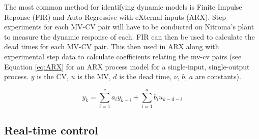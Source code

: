 The most common method for identifying dynamic models is Finite Impulse Reponse (FIR) and Auto Regressive with eXternal inputs (ARX). Step experiments for each MV-CV pair will have to be conducted on Nitroma's plant to measure the dynamic response of each. FIR can then be used to calculate the dead times for each MV-CV pair. This then used in ARX along with experimental step data to calculate coefficients relating the mv-cv pairs (see Equation \ref{eq:ARX} for an ARX process model for a single-input, single-output process. $y$ is the CV, $u$ is the MV, $d$ is the dead time, $\nu$, $b$, $a$ are constants). 

\begin{equation} \label{eq:ARX}
    y_k = \sum_{i=1}^{\nu}a_{i}y_{k-i} + \sum_{i=1}^{a}b_{i}u_{k-d-i}
\end{equation}


\subsection{Real-time control}